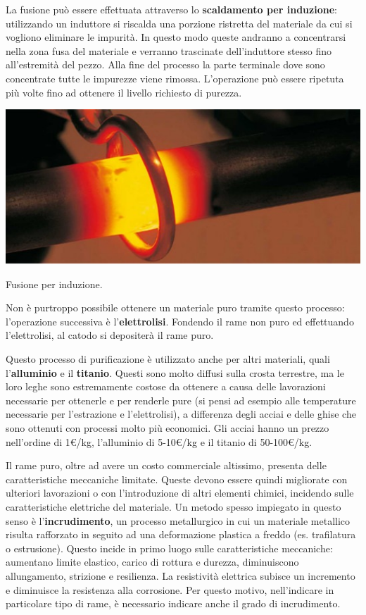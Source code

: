 La fusione può essere effettuata attraverso lo \textbf{scaldamento per induzione}: utilizzando un induttore si riscalda una porzione ristretta del materiale da cui si vogliono eliminare le impurità. In questo modo queste andranno a concentrarsi nella zona fusa del materiale e verranno trascinate dell'induttore stesso fino all'estremità del pezzo. Alla fine del processo la parte terminale dove sono concentrate tutte le impurezze viene rimossa. L'operazione può essere ripetuta più volte fino ad ottenere il livello richiesto di purezza.
\begin{marginfigure}[-5.5cm]
	\includegraphics{images/img3.jpg}
	\caption[Fusione per induzione]{Fusione per induzione.}
\end{marginfigure}

Non è purtroppo possibile ottenere un materiale puro tramite questo processo: l'operazione successiva è l'\textbf{elettrolisi}. Fondendo il rame non puro ed effettuando l'elettrolisi, al catodo si depositerà il rame puro.

Questo processo di purificazione è utilizzato anche per altri materiali, quali l'\textbf{alluminio} e il \textbf{titanio}. Questi sono molto diffusi sulla crosta terrestre, ma le loro leghe sono estremamente costose da ottenere a causa delle lavorazioni necessarie per ottenerle e per renderle pure (si pensi ad esempio alle temperature necessarie per l'estrazione e l'elettrolisi), a differenza degli acciai e delle ghise che sono ottenuti con processi molto più economici. Gli acciai hanno un prezzo nell'ordine di 1€/kg, l'alluminio di 5-10€/kg e il titanio di 50-100€/kg.

Il rame puro, oltre ad avere un costo commerciale altissimo, presenta delle caratteristiche meccaniche limitate. Queste devono essere quindi migliorate con ulteriori lavorazioni o con l'introduzione di altri elementi chimici, incidendo sulle caratteristiche elettriche del materiale. \newline
Un metodo spesso impiegato in questo senso è l'\textbf{incrudimento}, un processo metallurgico in cui un materiale metallico risulta rafforzato in seguito ad una deformazione plastica a freddo (es. trafilatura o estrusione). Questo incide in primo luogo sulle caratteristiche meccaniche: aumentano limite elastico, carico di rottura e durezza, diminuiscono allungamento, strizione e resilienza. La resistività elettrica subisce un incremento e diminuisce la resistenza alla corrosione. Per questo motivo, nell'indicare in particolare tipo di rame, è necessario indicare anche il grado di incrudimento.

